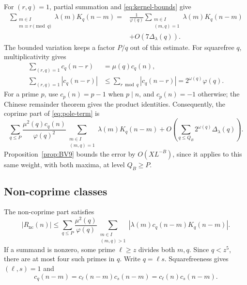 \documentclass{amsart}
\newcounter{fact}
\numberwithin{equation}{section}
\numberwithin{table}{section}
\newcommand{\m}{\mathfrak m}
\begin{document}
For $(r,q)=1$, partial summation and \eqref{eq:kernel-bounds} give
\begin{equation}\label{eq:kernel-distribution}
\begin{split}
\sum_{\substack{m\in I\\m\equiv r\pmod q}}\lambda(m)K_q(n-m)
={}&\frac1{\varphi(q)}
\sum_{\substack{m\in I\\(m,q)=1}}\lambda(m)K_q(n-m)\\
&+O(7\Delta_\lambda(q)).
\end{split}
\end{equation}
The bounded variation keeps a factor $P/q$ out of this estimate.
For squarefree $q$, multiplicativity gives
\begin{equation}\label{eq:Ramanujan-identities}
\begin{split}
\sum_{(r,q)=1}c_q(n-r)&=\mu(q)c_q(n),\\
\sum_{(r,q)=1}|c_q(n-r)|
&\le\sum_{r\bmod q}|c_q(n-r)|=2^{\omega(q)}\varphi(q).
\end{split}
\end{equation}
For a prime $p$, use $c_p(n)=p-1$ when $p\mid n$, and $c_p(n)=-1$
otherwise; the Chinese remainder theorem gives the product identities.
Consequently, the coprime part of \eqref{eq:pole-term} is
\begin{equation}\label{eq:coprime-pole}
\sum_{q\le P}\frac{\mu^2(q)c_q(n)}{\varphi(q)^2}
\sum_{\substack{m\in I\\(m,q)=1}}\lambda(m)K_q(n-m)
+O\left(\sum_{q\le Q_B}2^{\omega(q)}\Delta_\lambda(q)\right).
\end{equation}
Proposition~\ref{prop:BV9} bounds the error by $O(XL^{-B})$, since it
applies to this same weight, with both maxima, at level $Q_B\ge P$.

\subsection{Non-coprime classes}

The non-coprime part satisfies
\begin{equation}\label{eq:noncoprime-absolute}
|R_{\mathrm{nc}}(n)|
\le\sum_{q\le P}\frac{\mu^2(q)}{\varphi(q)}
\sum_{\substack{m\in I\\(m,q)>1}}
|\lambda(m)c_q(n-m)K_q(n-m)|.
\end{equation}
If a summand is nonzero, some prime $\ell\ge z$ divides both $m,q$.
Since $q<z^5$, there are at most four such primes in $q$.
Write $q=\ell s$. Squarefreeness gives $(\ell,s)=1$ and
\[
c_q(n-m)=c_\ell(n-m)c_s(n-m)=c_\ell(n)c_s(n-m).
\]
\end{document}
